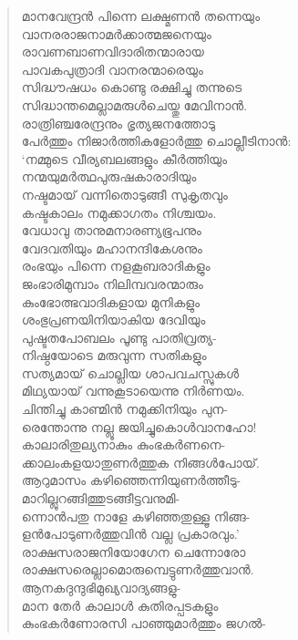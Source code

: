 \begin{verse}
മാനവേന്ദ്രന്‍ പിന്നെ ലക്ഷ്മണന്‍ തന്നെയും\\
വാനരരാജനാമര്‍ക്കാത്മജനെയും\\
രാവണബാണവിദാരിതന്മാരായ\\
പാവകപുത്രാദി വാനരന്മാരെയും\\
സിദ്ധൗഷധം കൊണ്ടു രക്ഷിച്ചു തന്നുടെ\\
സിദ്ധാന്തമെല്ലാമരുള്‍ചെയ്തു മേവിനാന്‍.\\
രാത്രിഞ്ചരേന്ദ്രനും ഭൃത്യജനത്തോടു\\
പേര്‍ത്തും നിജാര്‍ത്തികളോര്‍ത്തു ചൊല്ലീടിനാന്‍:\\
‘നമ്മുടെ വീര്യബലങ്ങളും കീര്‍ത്തിയും\\
നന്മയുമര്‍ത്ഥപുരുഷകാരാദിയും\\
നഷ്ടമായ് വന്നിതൊടുങ്ങീ സുകൃതവും\\
കഷ്ടകാലം നമുക്കാഗതം നിശ്ചയം.\\
വേധാവു താനുമനാരണ്യഭൂപനും\\
വേദവതിയും മഹാനന്ദികേശനും\\
രംഭയും പിന്നെ നളകൂബരാദികളും\\
ജംഭാരിമുമ്പാം നിലിമ്പവരന്മാരും\\
കുംഭോത്ഭവാദികളായ മുനികളും\\
ശംഭുപ്രണയിനിയാകിയ ദേവിയും\\
പുഷ്ടതപോബലം പൂണ്ടു പാതിവ്രത്യ-\\
നിഷ്ഠയോടെ മരുവുന്ന സതികളും\\
സത്യമായ് ചൊല്ലിയ ശാപവചസ്സുകള്‍\\
മിഥ്യയായ് വന്നുകൂടായെന്നു നിര്‍ണയം.\\
ചിന്തിച്ചു കാണ്മിന്‍ നമുക്കിനിയും പുന-\\
രെന്തോന്നു നല്ലൂ ജയിച്ചുകൊള്‍വാനഹോ!\\
കാലാരിതുല്യനാകും കുംഭകര്‍ണനെ-\\
ക്കാലംകളയാതുണര്‍ത്തുക നിങ്ങള്‍പോയ്.\\
ആറുമാസം കഴിഞ്ഞെന്നിയുണര്‍ത്തീടു-\\
മാറില്ലുറങ്ങിത്തുടങ്ങീട്ടവനുമി-\\
ന്നൊന്‍പതു നാളേ കഴിഞ്ഞതുള്ളൂ നിങ്ങ-\\
ളന്‍പോടുണര്‍ത്തുവിന്‍ വല്ല പ്രകാരവും.’\\
രാക്ഷസരാജനിയോഗേന ചെന്നോരോ\\
രാക്ഷസരെല്ലാമൊരുമ്പെട്ടുണര്‍ത്തുവാന്‍.\\
ആനകദുന്ദുഭിമുഖ്യവാദ്യങ്ങളു-\\
മാന തേര്‍ കാലാള്‍ കുതിരപ്പടകളും\\
കുംഭകര്‍ണോരസി പാഞ്ഞുമാര്‍ത്തും ജഗല്‍-\\

\end{verse}
